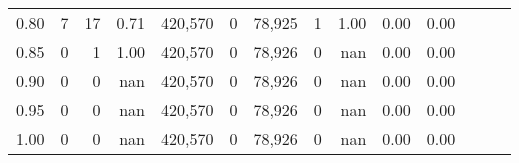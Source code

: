 \begin{tabular}{rrrrrrrrrrrrrr}
0.80 &        7 &      17 &  0.71 &  420,570 &        0 &  78,925 &       1 &  1.00 &  0.00 &      0.00 \\
0.85 &        0 &       1 &  1.00 &  420,570 &        0 &  78,926 &       0 &   nan &  0.00 &      0.00 \\
0.90 &        0 &       0 &   nan &  420,570 &        0 &  78,926 &       0 &   nan &  0.00 &      0.00 \\
0.95 &        0 &       0 &   nan &  420,570 &        0 &  78,926 &       0 &   nan &  0.00 &      0.00 \\
1.00 &        0 &       0 &   nan &  420,570 &        0 &  78,926 &       0 &   nan &  0.00 &      0.00 \\
\bottomrule
\end{tabular}
